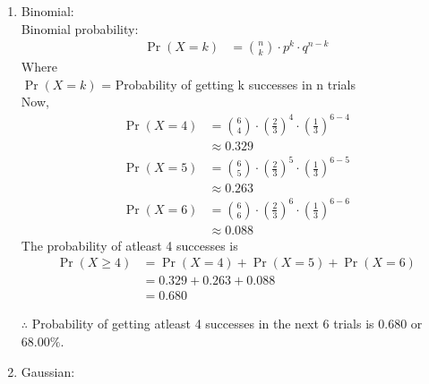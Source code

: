 \documentclass[journal,12pt,onecolumn]{article}
\providecommand{\pr}[1]{\ensuremath{\Pr\left(#1\right)}}
\theoremstyle{remark}
\begin{document}
\begin{enumerate}
	\item{Binomial:}\\
		Binomial probability:\\
		\begin{align}
			\pr{X=k} &=  \binom{n}{k}\cdot p^{k}\cdot q^{n-k}
		\end{align}
		Where\\ $\pr{X=k}$ = Probability of getting k successes in n trials\\
		Now,
		\begin{align}
			\pr{X=4}&=\binom{6}{4}\cdot \left(\frac{2}{3}\right)^{4}\cdot \left(\frac{1}{3}\right)^{6-4}\\
			&\approx 0.329\\
			\pr{X=5}&=\binom{6}{5}\cdot \left(\frac{2}{3}\right)^{5}\cdot \left(\frac{1}{3}\right)^{6-5}\\
			&\approx 0.263\\
			\pr{X=6}&=\binom{6}{6}\cdot \left(\frac{2}{3}\right)^{6}\cdot \left(\frac{1}{3}\right)^{6-6}\\
			&\approx 0.088
		\end{align}
		The probability of atleast 4 successes is
		\begin{align}
			\pr{X\geq4} &= \pr{X=4} + \pr{X=5} + \pr{X=6}\\
			&= 0.329 + 0.263 + 0.088\\
			&= 0.680
		\end{align}
	
$\therefore$ Probability of getting atleast 4 successes in the next 6 trials is $0.680$ or $68.00\%$.  
	\item{Gaussian:}\\


\end{enumerate}
\end{document}
